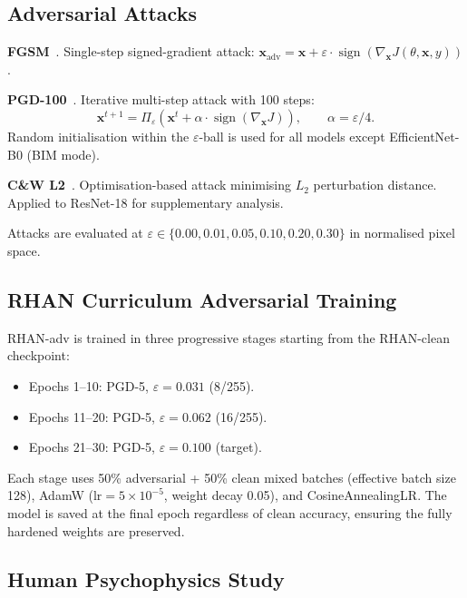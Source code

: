\documentclass[12pt,a4paper]{article}
\begin{document}
\subsection{Adversarial Attacks}

\textbf{FGSM}~\citep{goodfellow2015explaining}.
Single-step signed-gradient attack:
$\mathbf{x}_{\text{adv}} = \mathbf{x} +
\varepsilon \cdot \operatorname{sign}(\nabla_{\!\mathbf{x}}
J(\theta,\mathbf{x},y))$.

\textbf{PGD-100}~\citep{madry2018towards}.
Iterative multi-step attack with 100 steps:
\begin{equation}
  \mathbf{x}^{t+1} = \Pi_{\varepsilon}\!\left(
    \mathbf{x}^{t} +
    \alpha\cdot\operatorname{sign}(\nabla_{\!\mathbf{x}} J)
  \right), \qquad \alpha = \varepsilon/4.
  \label{eq:pgd}
\end{equation}
Random initialisation within the $\varepsilon$-ball is used for all models
except EfficientNet-B0 (BIM mode).

\textbf{C\&W L2}~\citep{carlini2017towards}.
Optimisation-based attack minimising $L_2$ perturbation distance.
Applied to ResNet-18 for supplementary analysis.

Attacks are evaluated at
$\varepsilon \in \{0.00, 0.01, 0.05, 0.10, 0.20, 0.30\}$
in normalised pixel space.

\subsection{RHAN Curriculum Adversarial Training}

RHAN-adv is trained in three progressive stages starting from the
RHAN-clean checkpoint:
\begin{itemize}[leftmargin=1.5em]
  \item Epochs 1--10: PGD-5, $\varepsilon{=}0.031$ (8/255).
  \item Epochs 11--20: PGD-5, $\varepsilon{=}0.062$ (16/255).
  \item Epochs 21--30: PGD-5, $\varepsilon{=}0.100$ (target).
\end{itemize}
Each stage uses 50\% adversarial + 50\% clean mixed batches (effective batch
size 128), AdamW ($\text{lr}{=}5{\times}10^{-5}$, weight decay 0.05),
and CosineAnnealingLR. The model is saved at the final epoch regardless of
clean accuracy, ensuring the fully hardened weights are preserved.

\subsection{Human Psychophysics Study}
\end{document}
